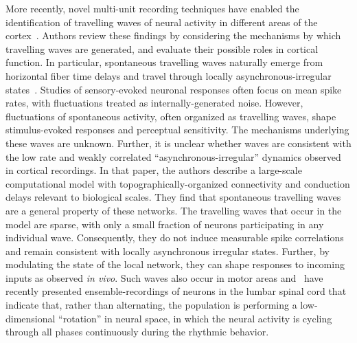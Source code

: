 \documentclass[brainsci, %
               review,submit,pdftex,moreauthors
               ]{Definitions/mdpi}
\begin{document}
More recently, novel multi-unit recording techniques have enabled the identification of travelling waves of neural activity in different areas of the cortex~\citep{muller_cortical_2018}. Authors review these findings by considering the mechanisms by which travelling waves are generated, and evaluate their possible roles in cortical function. In particular, spontaneous travelling waves naturally emerge from horizontal fiber time delays and travel through locally asynchronous-irregular states~\citep{davis_spontaneous_2021}. Studies of sensory-evoked neuronal responses often focus on mean spike rates, with fluctuations treated as internally-generated noise. However, fluctuations of spontaneous activity, often organized as travelling waves, shape stimulus-evoked responses and perceptual sensitivity. The mechanisms underlying these waves are unknown. Further, it is unclear whether waves are consistent with the low rate and weakly correlated ``asynchronous-irregular'' dynamics observed in cortical recordings. In that paper, the authors describe a large-scale computational model with topographically-organized connectivity and conduction delays relevant to biological scales. They find that spontaneous travelling waves are a general property of these networks. The travelling waves that occur in the model are sparse, with only a small fraction of neurons participating in any individual wave. Consequently, they do not induce measurable spike correlations and remain consistent with locally asynchronous irregular states. Further, by modulating the state of the local network, they can shape responses to incoming inputs as observed \emph{in vivo}. Such waves also occur in motor areas and~\citet{linden_movement_2022} have recently presented ensemble-recordings of neurons in the lumbar spinal cord that indicate that, rather than alternating, the population is performing a low-dimensional ``rotation'' in neural space, in which the neural activity is cycling through all phases continuously during the rhythmic behavior.
\end{document}
